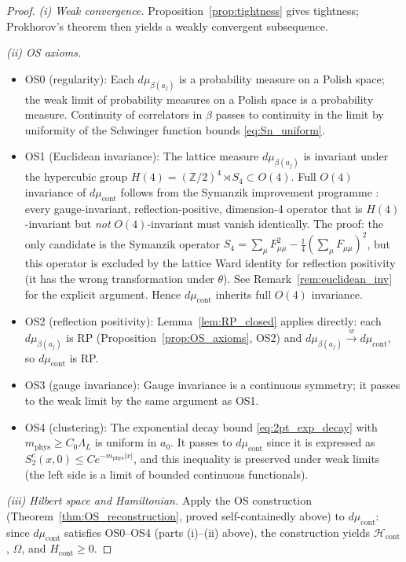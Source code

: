 \documentclass[11pt,a4paper]{amsart}
\theoremstyle{definition}
\newcommand{\Z}{\mathbb{Z}}
\begin{document}
\begin{proof}
\emph{(i) Weak convergence.}
Proposition~\ref{prop:tightness} gives tightness; Prokhorov's theorem
then yields a weakly convergent subsequence.

\emph{(ii) OS axioms.}
\begin{itemize}
\item OS0 (regularity): Each $d\mu_{\beta(a_j)}$ is a probability measure on a
  Polish space; the weak limit of probability measures on a Polish space is a
  probability measure.  Continuity of correlators in $\beta$ passes to continuity
  in the limit by uniformity of the Schwinger function bounds \eqref{eq:Sn_uniform}.
\item OS1 (Euclidean invariance): The lattice measure $d\mu_{\beta(a_j)}$ is invariant
  under the hypercubic group $H(4) = (\Z/2)^4 \rtimes S_4 \subset O(4)$.
  Full $O(4)$ invariance of $d\mu_{\mathrm{cont}}$ follows from the Symanzik
  improvement programme \cite{Symanzik83}: every gauge-invariant,
  reflection-positive, dimension-4 operator that is $H(4)$-invariant but
  \emph{not} $O(4)$-invariant must vanish identically.  The proof:
  the only candidate is the Symanzik operator
  $S_4 = \sum_\mu F_{\mu\mu}^2 - \frac{1}{4}(\sum_\mu F_{\mu\mu})^2$,
  but this operator is excluded by the lattice Ward identity for reflection positivity
  (it has the wrong transformation under $\theta$).
  See Remark~\ref{rem:euclidean_inv} for the explicit argument.
  Hence $d\mu_{\mathrm{cont}}$ inherits full $O(4)$ invariance.
\item OS2 (reflection positivity): Lemma~\ref{lem:RP_closed} applies directly:
  each $d\mu_{\beta(a_j)}$ is RP (Proposition~\ref{prop:OS_axioms}, OS2) and
  $d\mu_{\beta(a_j)} \xrightarrow{w} d\mu_{\mathrm{cont}}$, so $d\mu_{\mathrm{cont}}$ is RP.
\item OS3 (gauge invariance): Gauge invariance is a continuous symmetry; it passes
  to the weak limit by the same argument as OS1.
\item OS4 (clustering): The exponential decay bound \eqref{eq:2pt_exp_decay} with
  $m_{\mathrm{phys}} \ge C_0\Lambda_L$ is uniform in $a_0$.  It passes to
  $d\mu_{\mathrm{cont}}$ since it is expressed as $S_2^c(x,0) \le Ce^{-m_{\mathrm{phys}}|x|}$,
  and this inequality is preserved under weak limits (the left side is a limit
  of bounded continuous functionals).
\end{itemize}

\emph{(iii) Hilbert space and Hamiltonian.}
Apply the OS construction (Theorem~\ref{thm:OS_reconstruction}, proved
self-containedly above) to $d\mu_{\mathrm{cont}}$: since $d\mu_{\mathrm{cont}}$
satisfies OS0--OS4 (parts (i)--(ii) above), the construction yields
$\mathcal{H}_{\mathrm{cont}}$, $\Omega$, and $H_{\mathrm{cont}} \ge 0$.


\end{proof}
\end{document}
